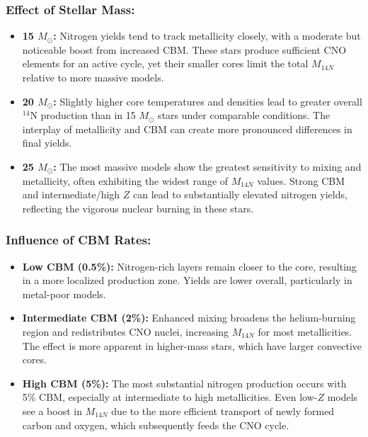 \subsubsection{Effect of Stellar Mass:}  
\begin{itemize}
    \item \textbf{15 $M_\odot$:} 
    Nitrogen yields tend to track metallicity closely, with a moderate but noticeable boost from increased CBM. These stars produce sufficient CNO elements for an active cycle, yet their smaller cores limit the total $M_{14N}$ relative to more massive models.
    \item \textbf{20 $M_\odot$:} 
    Slightly higher core temperatures and densities lead to greater overall $^{14}$N production than in 15 $M_\odot$ stars under comparable conditions. The interplay of metallicity and CBM can create more pronounced differences in final yields.
    \item \textbf{25 $M_\odot$:} 
    The most massive models show the greatest sensitivity to mixing and metallicity, often exhibiting the widest range of $M_{14N}$ values. Strong CBM and intermediate/high $Z$ can lead to substantially elevated nitrogen yields, reflecting the vigorous nuclear burning in these stars.
\end{itemize}

\subsubsection{Influence of CBM Rates:}  
\begin{itemize}
    \item \textbf{Low CBM (0.5\%):} 
    Nitrogen-rich layers remain closer to the core, resulting in a more localized production zone. Yields are lower overall, particularly in metal-poor models.
    \item \textbf{Intermediate CBM (2\%):} 
    Enhanced mixing broadens the helium-burning region and redistributes CNO nuclei, increasing $M_{14N}$ for most metallicities. The effect is more apparent in higher-mass stars, which have larger convective cores.
    \item \textbf{High CBM (5\%):} 
    The most substantial nitrogen production occurs with 5\% CBM, especially at intermediate to high metallicities. Even low-$Z$ models see a boost in $M_{14N}$ due to the more efficient transport of newly formed carbon and oxygen, which subsequently feeds the CNO cycle.
\end{itemize}

